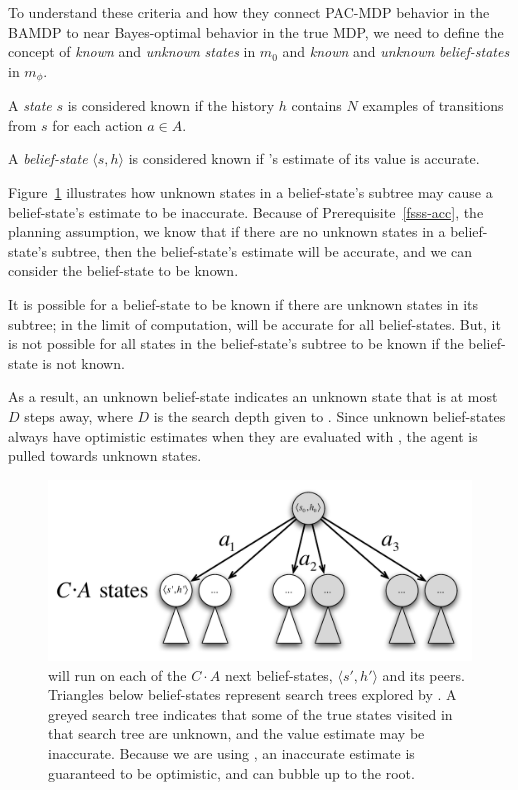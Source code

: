 To understand these criteria and how they connect PAC-MDP behavior in the BAMDP to near Bayes-optimal behavior in the true MDP, we need to define the concept of \emph{known} and \emph{unknown} \emph{states} in $m_0$ and  \emph{known} and \emph{unknown} \emph{belief-states} in $m_\phi$.

A \emph{state} $s$ is considered known if the history $h$ contains $N$ examples of transitions from $s$ for each action $a\in A$.

A \emph{belief-state} $\langle s, h \rangle$ is considered known if 's estimate of its value is accurate.

Figure~\ref{fig:bfs3tree} illustrates how unknown states in a belief-state's  subtree may cause a belief-state's estimate to be inaccurate. Because of Prerequisite~\ref{fsss-acc}, the planning assumption, we know that if there are no unknown states in a belief-state's subtree, then the belief-state's estimate will be accurate, and we can consider the belief-state to be known.

It is possible for a belief-state to be known if there are unknown states in its subtree; in the limit of computation,  will be accurate for all belief-states. But, it is not possible for all states in the belief-state's subtree to be known if the belief-state is not known.

As a result, an unknown belief-state indicates an unknown state that is at most $D$ steps away, where $D$ is the search depth given to . Since unknown belief-states always have optimistic estimates when they are evaluated with , the agent is pulled towards unknown states.

\begin{figure}
\vskip 0.2in
\begin{center}
\centerline{\includegraphics[scale=0.5]{bfs3tree}}
\caption{
 will run  on each of the $C\cdot A$ next belief-states, $\langle s', h' \rangle$ and its peers. Triangles below belief-states represent search trees explored by . A greyed search tree indicates that some of the true states visited in that search tree are unknown, and the value estimate may be inaccurate. Because we are using , an inaccurate estimate is guaranteed to be optimistic, and can bubble up to the root.
}
\label{fig:bfs3tree}
\end{center}
\vskip -0.2in
\end{figure} 

